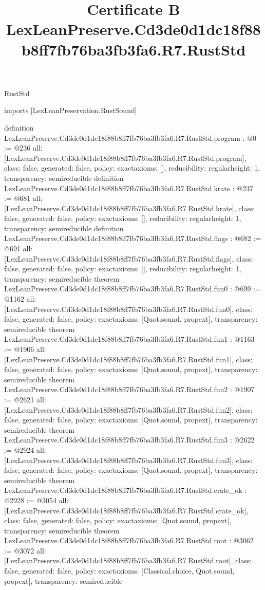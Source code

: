 \begin{lexlean}{RustStd}
\title{Certificate B LexLeanPreserve.Cd3de0d1dc18f88b8ff7fb76ba3fb3fa6.R7.RustStd}
\begin{coremodule}
imports [LexLeanPreservation.RustSound]

definition LexLeanPreserve.Cd3de0d1dc18f88b8ff7fb76ba3fb3fa6.R7.RustStd.program : @0 := @236 {
  all: [LexLeanPreserve.Cd3de0d1dc18f88b8ff7fb76ba3fb3fa6.R7.RustStd.program],
  class: false,
  generated: false,
  policy: exact{axioms: []},
  reducibility: regular{height: 1},
  transparency: semireducible
}
definition LexLeanPreserve.Cd3de0d1dc18f88b8ff7fb76ba3fb3fa6.R7.RustStd.krate : @237 := @681 {
  all: [LexLeanPreserve.Cd3de0d1dc18f88b8ff7fb76ba3fb3fa6.R7.RustStd.krate],
  class: false,
  generated: false,
  policy: exact{axioms: []},
  reducibility: regular{height: 1},
  transparency: semireducible
}
definition LexLeanPreserve.Cd3de0d1dc18f88b8ff7fb76ba3fb3fa6.R7.RustStd.flags : @682 := @691 {
  all: [LexLeanPreserve.Cd3de0d1dc18f88b8ff7fb76ba3fb3fa6.R7.RustStd.flags],
  class: false,
  generated: false,
  policy: exact{axioms: []},
  reducibility: regular{height: 1},
  transparency: semireducible
}
theorem LexLeanPreserve.Cd3de0d1dc18f88b8ff7fb76ba3fb3fa6.R7.RustStd.fun0 : @699 := @1162 {
  all: [LexLeanPreserve.Cd3de0d1dc18f88b8ff7fb76ba3fb3fa6.R7.RustStd.fun0],
  class: false,
  generated: false,
  policy: exact{axioms: [Quot.sound, propext]},
  transparency: semireducible
}
theorem LexLeanPreserve.Cd3de0d1dc18f88b8ff7fb76ba3fb3fa6.R7.RustStd.fun1 : @1163 := @1906 {
  all: [LexLeanPreserve.Cd3de0d1dc18f88b8ff7fb76ba3fb3fa6.R7.RustStd.fun1],
  class: false,
  generated: false,
  policy: exact{axioms: [Quot.sound, propext]},
  transparency: semireducible
}
theorem LexLeanPreserve.Cd3de0d1dc18f88b8ff7fb76ba3fb3fa6.R7.RustStd.fun2 : @1907 := @2621 {
  all: [LexLeanPreserve.Cd3de0d1dc18f88b8ff7fb76ba3fb3fa6.R7.RustStd.fun2],
  class: false,
  generated: false,
  policy: exact{axioms: [Quot.sound, propext]},
  transparency: semireducible
}
theorem LexLeanPreserve.Cd3de0d1dc18f88b8ff7fb76ba3fb3fa6.R7.RustStd.fun3 : @2622 := @2924 {
  all: [LexLeanPreserve.Cd3de0d1dc18f88b8ff7fb76ba3fb3fa6.R7.RustStd.fun3],
  class: false,
  generated: false,
  policy: exact{axioms: [Quot.sound, propext]},
  transparency: semireducible
}
theorem LexLeanPreserve.Cd3de0d1dc18f88b8ff7fb76ba3fb3fa6.R7.RustStd.crate_ok : @2928 := @3054 {
  all: [LexLeanPreserve.Cd3de0d1dc18f88b8ff7fb76ba3fb3fa6.R7.RustStd.crate_ok],
  class: false,
  generated: false,
  policy: exact{axioms: [Quot.sound, propext]},
  transparency: semireducible
}
theorem LexLeanPreserve.Cd3de0d1dc18f88b8ff7fb76ba3fb3fa6.R7.RustStd.root : @3062 := @3072 {
  all: [LexLeanPreserve.Cd3de0d1dc18f88b8ff7fb76ba3fb3fa6.R7.RustStd.root],
  class: false,
  generated: false,
  policy: exact{axioms: [Classical.choice, Quot.sound, propext]},
  transparency: semireducible
}


\end{coremodule}
\end{lexlean}
